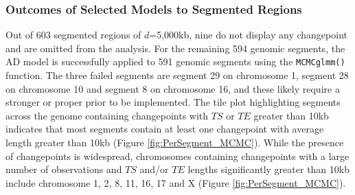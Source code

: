 \subsubsection{Outcomes of Selected Models to Segmented Regions}
Out of 603 segmented regions of $d$=5,000kb, nine do not display any changepoint and are omitted from the analysis. For the remaining 594 genomic segments, the AD model is successfully applied to 591 genomic segments using the \texttt{MCMCglmm()} function. The three failed segments are segment 29 on chromosome 1, segment 28 on chromosome 10 and segment 8 on chromosome 16, and these likely require a stronger or proper prior to be implemented. The tile plot highlighting segments across the genome containing changepoints with $TS$ or $TE$ greater than 10kb indicates that most segments contain at least one changepoint with average length greater than 10kb (Figure \ref{fig:PerSegment_MCMC}). While the presence of changepoints is widespread, chromosomes containing changepoints with a large number of observations and $TS$ and/or $TE$ lengths significantly greater than 10kb include chromosome 1, 2, 8, 11, 16, 17 and X (Figure \ref{fig:PerSegment_MCMC}). 

